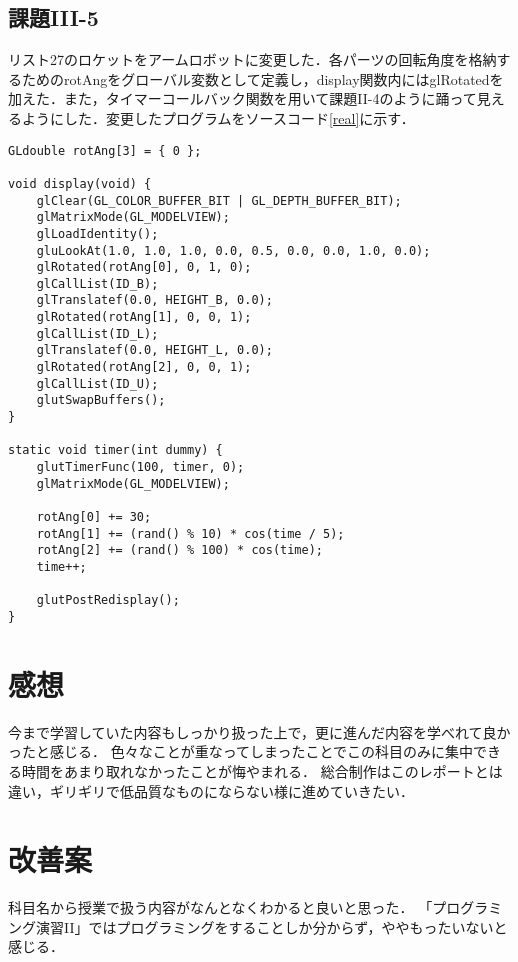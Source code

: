 \documentclass[]{jarticle}
\begin{document}
\subsection{課題III-5}
リスト27のロケットをアームロボットに変更した．各パーツの回転角度を格納するためのrotAngをグローバル変数として定義し，display関数内にはglRotatedを加えた．また，タイマーコールバック関数を用いて課題II-4のように踊って見えるようにした．変更したプログラムをソースコード\ref{real}に示す．
\begin{lstlisting}[caption=リスト27の変更部分,label=real]
GLdouble rotAng[3] = { 0 };

void display(void) {
	glClear(GL_COLOR_BUFFER_BIT | GL_DEPTH_BUFFER_BIT);
	glMatrixMode(GL_MODELVIEW);
	glLoadIdentity();
	gluLookAt(1.0, 1.0, 1.0, 0.0, 0.5, 0.0, 0.0, 1.0, 0.0);
	glRotated(rotAng[0], 0, 1, 0);
	glCallList(ID_B);
	glTranslatef(0.0, HEIGHT_B, 0.0);
	glRotated(rotAng[1], 0, 0, 1);
	glCallList(ID_L);
	glTranslatef(0.0, HEIGHT_L, 0.0);
	glRotated(rotAng[2], 0, 0, 1);
	glCallList(ID_U);
	glutSwapBuffers();
}

static void timer(int dummy) {
	glutTimerFunc(100, timer, 0);
	glMatrixMode(GL_MODELVIEW);

	rotAng[0] += 30;
	rotAng[1] += (rand() % 10) * cos(time / 5);
	rotAng[2] += (rand() % 100) * cos(time);
	time++;

	glutPostRedisplay();
}
\end{lstlisting}

\section{感想}
今まで学習していた内容もしっかり扱った上で，更に進んだ内容を学べれて良かったと感じる．
色々なことが重なってしまったことでこの科目のみに集中できる時間をあまり取れなかったことが悔やまれる．
総合制作はこのレポートとは違い，ギリギリで低品質なものにならない様に進めていきたい．

\section{改善案}
科目名から授業で扱う内容がなんとなくわかると良いと思った．
「プログラミング演習II」ではプログラミングをすることしか分からず，ややもったいないと感じる．
\end{document}
